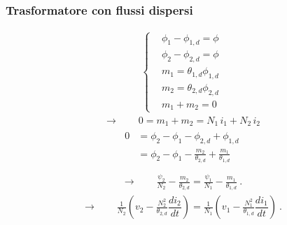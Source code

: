 \documentclass[letterpaper,10pt,italian]{jupyterBook}
\begin{document}
\subsubsection{Trasformatore con flussi dispersi}
\label{\detokenize{ch/circuits-electromagnetic-transformer:trasformatore-con-flussi-dispersi}}\begin{equation*}
\begin{split}\begin{cases}
 & \phi_1 - \phi_{1,d} = \phi \\
 & \phi_2 - \phi_{2,d} = \phi \\
 & m_1 = \theta_{1,d} \phi_{1,d} \\
 & m_2 = \theta_{2,d} \phi_{2,d} \\
 & m_1 + m_2 = 0
\end{cases}\end{split}
\end{equation*}\begin{equation*}
\begin{split}\rightarrow \qquad 0 = m_1 + m_2 = N_1 \, i_1 + N_2 \, i_2\end{split}
\end{equation*}\begin{equation*}
\begin{split}\begin{aligned}
  0 & = \phi_2 - \phi_1 - \phi_{2,d} + \phi_{1,d} \\
    & = \phi_2 - \phi_1 - \frac{m_2}{\theta_{2,d}} + \frac{m_1}{\theta_{1,d}} \\
\end{aligned}\end{split}
\end{equation*}\begin{equation*}
\begin{split}\rightarrow \qquad \frac{\psi_2}{N_2} - \frac{m_2}{\theta_{2,d}} = \frac{\psi_1}{N_1} - \frac{m_1}{\theta_{1,d}} \ .\end{split}
\end{equation*}\begin{equation*}
\begin{split}\rightarrow \qquad \frac{1}{N_2} \left( v_2 - \frac{N_2^2}{\theta_{2,d}} \dfrac{d i_2}{d t} \right) =  
                     \frac{1}{N_1} \left( v_1 - \frac{N_1^2}{\theta_{1,d}} \dfrac{d i_1}{d t} \right)  \ .\end{split}
\end{equation*}
\end{document}

